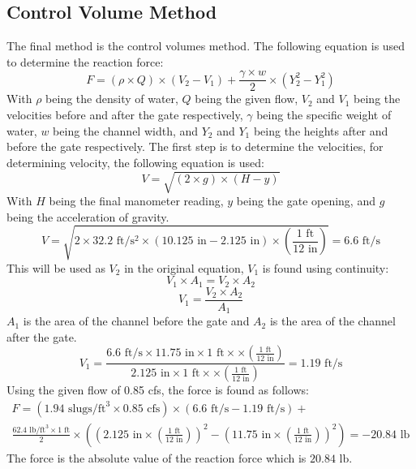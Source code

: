 \documentclass{article}
\begin{document}
\subsection{Control Volume Method}
\noindent The final method is the control volumes method. The following equation is used to determine the reaction force: 
\[F=(\rho\times Q)\times(V_2-V_1)+\frac{\gamma\times w}{2}\times(Y_2^2-Y_1^2)\]
With $\rho$ being the density of water, $Q$ being the given flow, $V_2$ and $V_1$ being the velocities before and after the gate respectively, $\gamma$ being the specific weight of water, $w$ being the channel width, and $Y_2$ and $Y_1$ being the heights after and before the gate respectively. The first step is to determine the velocities, for determining velocity, the following equation is used: 
\[V=\sqrt{(2\times g)\times(H-y)}\]
With $H$ being the final manometer reading, $y$ being the gate opening, and $g$ being the acceleration of gravity.
\[V=\sqrt{2\times 32.2\text{ ft}/\text{s}^2\times(10.125\text{ in}-2.125\text{ in})\times\left(\frac{1 \text{ ft}}{12\text{ in}}\right)}=6.6\text{ ft}/\text{s}\]
This will be used as $V_2$ in the original equation, $V_1$ is found using continuity: 
\[V_1\times A_1 = V_2\times A_2\] 
\[V_1=\frac{V_2\times A_2}{A_1}\]
$A_1$ is the area of the channel before the gate and $A_2$ is the area of the channel after the gate. 
\[V_1=\frac{6.6\text{ ft}/\text{s}\times 11.75\text{ in}\times 1\text{ ft}\times \times\left(\frac{1 \text{ ft}}{12\text{ in}}\right)}{2.125\text{ in}\times 1\text{ ft}\times \times\left(\frac{1 \text{ ft}}{12\text{ in}}\right)}=1.19\text{ ft}/\text{s}\]
Using the given flow of 0.85 cfs, the force is found as follows: 
\begin{multline*}
    F=(1.94\text{ slugs}/\text{ft}^3\times 0.85\text{ cfs})\times(6.6\text{ ft}/\text{s}-1.19\text{ ft}/\text{s})+\\\frac{62.4\text{ lb}/\text{ft}^3\times 1\text{ ft}}{2}\times\left(\left(2.125\text{ in}\times\left(\frac{1 \text{ ft}}{12\text{ in}}\right)\right)^2-\left(11.75\text{ in}\times\left(\frac{1 \text{ ft}}{12\text{ in}}\right)\right)^2\right)=-20.84\text{ lb}
\end{multline*}
The force is the absolute value of the reaction force which is $\boxed{20.84\text{ lb}}$.
\newpage
\end{document}
